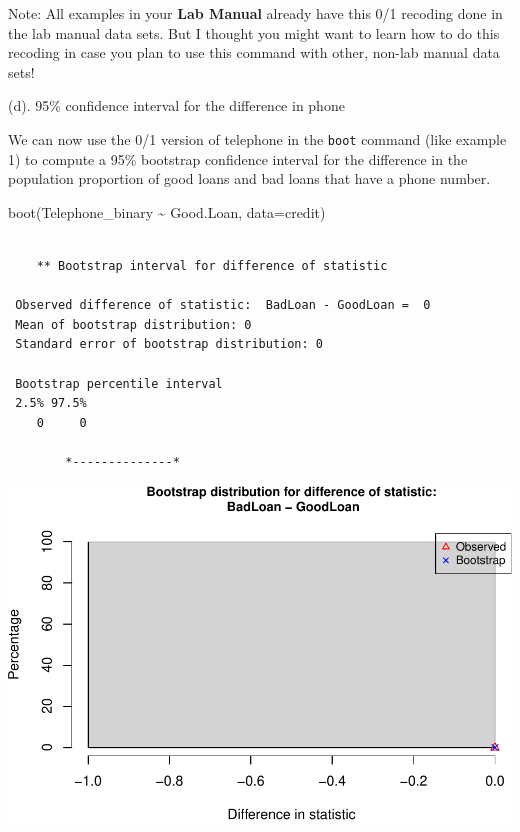 \documentclass[
]{book}
\newenvironment{Shaded}{\begin{snugshade}}{\end{snugshade}}
\newcommand{\AttributeTok}[1]{\textcolor[rgb]{0.77,0.63,0.00}{#1}}
\newcommand{\FunctionTok}[1]{\textcolor[rgb]{0.00,0.00,0.00}{#1}}
\newcommand{\NormalTok}[1]{#1}
\newcommand{\SpecialCharTok}[1]{\textcolor[rgb]{0.00,0.00,0.00}{#1}}
\begin{document}
Note: All examples in your \textbf{Lab Manual} already have this 0/1 recoding done in the lab manual data sets. But I thought you might want to learn how to do this recoding in case you plan to use this command with other, non-lab manual data sets!

(d). 95\% confidence interval for the difference in phone

We can now use the 0/1 version of telephone in the \texttt{boot} command (like example 1) to compute a 95\% bootstrap confidence interval for the difference in the population proportion of good loans and bad loans that have a phone number.

\begin{Shaded}
\begin{Highlighting}[]
\FunctionTok{boot}\NormalTok{(Telephone\_binary }\SpecialCharTok{\textasciitilde{}}\NormalTok{ Good.Loan, }\AttributeTok{data=}\NormalTok{credit)}
\end{Highlighting}
\end{Shaded}

\begin{verbatim}

    ** Bootstrap interval for difference of statistic

 Observed difference of statistic:  BadLoan - GoodLoan =  0 
 Mean of bootstrap distribution: 0 
 Standard error of bootstrap distribution: 0 

 Bootstrap percentile interval
 2.5% 97.5% 
    0     0 

        *--------------*
\end{verbatim}

\includegraphics[width=1\linewidth]{Class_Activity_8_files/figure-latex/unnamed-chunk-20-1}
\end{document}
